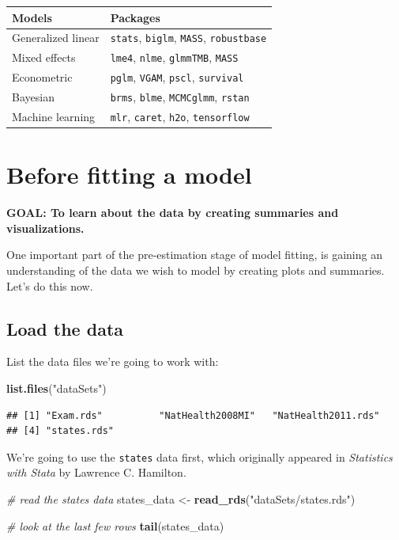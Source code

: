\documentclass[]{book}
\newenvironment{Shaded}{\begin{snugshade}}{\end{snugshade}}
\newcommand{\CommentTok}[1]{\textcolor[rgb]{0.56,0.35,0.01}{\textit{#1}}}
\newcommand{\KeywordTok}[1]{\textcolor[rgb]{0.13,0.29,0.53}{\textbf{#1}}}
\newcommand{\NormalTok}[1]{#1}
\newcommand{\StringTok}[1]{\textcolor[rgb]{0.31,0.60,0.02}{#1}}
\begin{document}
\begin{longtable}[]{@{}ll@{}}
\toprule
Models & Packages\tabularnewline
\midrule
\endhead
Generalized linear & \texttt{stats}, \texttt{biglm}, \texttt{MASS}, \texttt{robustbase}\tabularnewline
Mixed effects & \texttt{lme4}, \texttt{nlme}, \texttt{glmmTMB}, \texttt{MASS}\tabularnewline
Econometric & \texttt{pglm}, \texttt{VGAM}, \texttt{pscl}, \texttt{survival}\tabularnewline
Bayesian & \texttt{brms}, \texttt{blme}, \texttt{MCMCglmm}, \texttt{rstan}\tabularnewline
Machine learning & \texttt{mlr}, \texttt{caret}, \texttt{h2o}, \texttt{tensorflow}\tabularnewline
\bottomrule
\end{longtable}

\hypertarget{before-fitting-a-model}{%
\section{Before fitting a model}\label{before-fitting-a-model}}

\textbf{GOAL: To learn about the data by creating summaries and visualizations.}

One important part of the pre-estimation stage of model fitting, is gaining an understanding
of the data we wish to model by creating plots and summaries. Let's do this now.

\hypertarget{load-the-data}{%
\subsection{Load the data}\label{load-the-data}}

List the data files we're going to work with:

\begin{Shaded}
\begin{Highlighting}[]
\KeywordTok{list.files}\NormalTok{(}\StringTok{"dataSets"}\NormalTok{)}
\end{Highlighting}
\end{Shaded}

\begin{verbatim}
## [1] "Exam.rds"          "NatHealth2008MI"   "NatHealth2011.rds"
## [4] "states.rds"
\end{verbatim}

We're going to use the \texttt{states} data first, which originally appeared in \emph{Statistics with Stata} by Lawrence C. Hamilton.

\begin{Shaded}
\begin{Highlighting}[]
  \CommentTok{# read the states data}
\NormalTok{  states_data <-}\StringTok{ }\KeywordTok{read_rds}\NormalTok{(}\StringTok{"dataSets/states.rds"}\NormalTok{)}

  \CommentTok{# look at the last few rows}
  \KeywordTok{tail}\NormalTok{(states_data)}
\end{Highlighting}
\end{Shaded}
\end{document}

